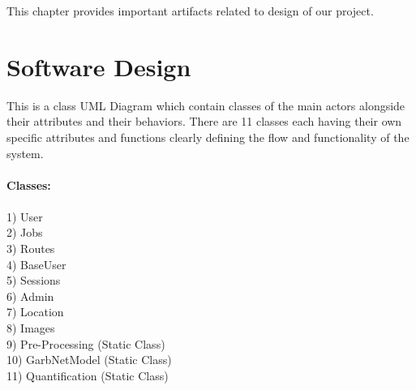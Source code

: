 This chapter provides important artifacts related to design of our project.

\section{Software Design}

This is a class UML Diagram which contain classes of the main actors alongside their attributes and their behaviors. There are 11 classes each having their own specific attributes and functions clearly defining the flow and functionality of the system.\\ 
\\
\textbf{Classes:}\\
\\
1)  User\\
2)  Jobs\\
3)  Routes\\
4)  BaseUser\\
5)  Sessions\\
6)  Admin\\
7)  Location\\
8)  Images\\
9)  Pre-Processing  (Static Class)\\
10) GarbNetModel    (Static Class)\\
11) Quantification  (Static Class)\\
\\

